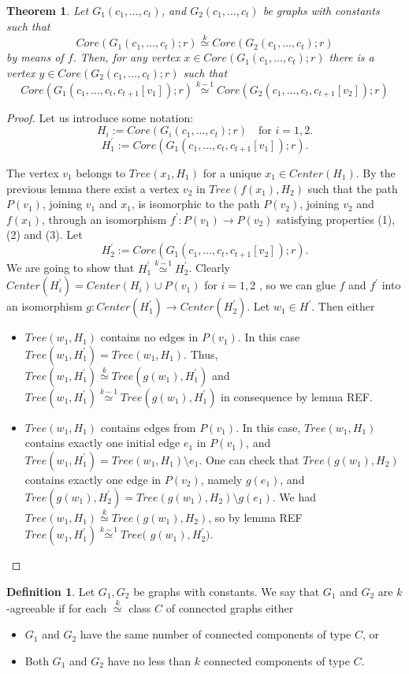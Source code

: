 \documentclass[11pt,notitlepage]{report}
\newtheorem{theorem}{Theorem}[chapter]
\theoremstyle{definition}
\newtheorem{definition}{Definition}[chapter]
\theoremstyle{remark}
\newcommand{\morph}[1]{\stackrel{#1}{\simeq}}
\begin{document}
\begin{theorem} 
	Let $G_1(c_1,\dots, c_t)$, and $G_2(c_1,\dots,c_t)$ be graphs
	with constants such that 
	\[ Core(G_1(c_1,\dots, c_t);r)\morph{k} Core(G_2(c_1,\dots,c_t);r)\]
	by means of $f$. 
	Then, for any vertex $x\in Core(G_1(c_1,\dots, c_t);r)$ there is a vertex
	$y\in Core(G_2(c_1,\dots, c_t);r)$ such that 
	\[Core(G_1(c_1,\dots, c_t,c_{t+1}[v_1]);r)\morph{k-1} Core(G_2(c_1,\dots,c_t,c_{t+1}[v_2]);r)\]
\end{theorem}
\begin{proof}
	Let us introduce some notation:
	\[H_i:=Core(G_i(c_1,\dots, c_t);r)\quad \text{for }i=1,2. \]
	\[H^\prime_1:=Core(G_1(c_1,\dots, c_t,c_{t+1}[v_1]);r).\]
	
	The vertex $v_1$ belongs to $Tree(x_1,H_1)$
	for a unique $x_1\in Center(H_1)$. By the previous lemma there exist a vertex $v_2$ in 
	$Tree(f(x_1),H_2)$ such that the path $P(v_1)$, 
	joining $v_1$ and $x_1$, is isomorphic to the path
	$P(v_2)$, joining $v_2$ and $f(x_1)$, through an isomorphism $f^\prime: P(v_1)
	\rightarrow P(v_2)$ satisfying properties (1), (2) and (3). 
	Let 
	\[H^\prime_2:=Core(G_1(c_1,\dots, c_t,c_{t+1}[v_2]);r).\]
	We are going to show that $H^\prime_1\morph{k-1}H^\prime_2$.
	Clearly $Center(H^\prime_i)=Center(H_i)\cup P(v_1)$ for $i=1,2$ , so we can glue
	$f$ and $f^\prime$ into an isomorphism $g:Center(H^\prime_1)\rightarrow Center(H^\prime_2)$.
	Let $w_1\in H^\prime$. Then either
	\begin{itemize}
		\item $Tree(w_1,H_1)$ contains no edges in $P(v_1)$. 
		In this case $Tree(w_1,H^\prime_1)=Tree(w_1,H_1)$.
		Thus, $Tree(w_1,H^\prime_1)\morph{k} Tree(g(w_1),H^\prime_1)$
		and $Tree(w_1,H^\prime_1)\morph{k-1} Tree(g(w_1),H^\prime_1)$
		in consequence by lemma REF.
		\item $Tree(w_1,H_1)$ contains edges from $P(v_1)$.
		In this case, $Tree(w_1,H_1)$ contains exactly one initial edge
		$e_1$ in $P(v_1)$, and $Tree(w_1,H^\prime_1)=Tree(w_1,H_1)\setminus e_1$.
		One can check that $Tree(g(w_1),H_2)$ contains exactly one edge
		in $P(v_2)$, namely $g(e_1)$, and 
		$Tree(g(w_1),H^\prime_2)=Tree(g(w_1),H_2)\setminus g(e_1)$.
		We had $Tree(w_1,H_1)\morph{k}Tree(g(w_1),H_2)$, so by lemma REF
		$Tree(w_1,H^\prime_1)\morph{k-1}Tree($ $g(w_1),H^\prime_2)$.	
	\end{itemize}
\end{proof}


\begin{definition}
	Let $G_1,G_2$ be graphs with constants. We say that $G_1$ and $G_2$ are
	$k$-agreeable if for each $\morph{k}$ class $C$ of connected graphs either
	\begin{itemize}
		\item $G_1$ and $G_2$ have the same number of connected components of type $C$, or
		\item Both $G_1$ and $G_2$ have no less than $k$ connected components of type $C$.
	\end{itemize} 
\end{definition}
\end{document}
